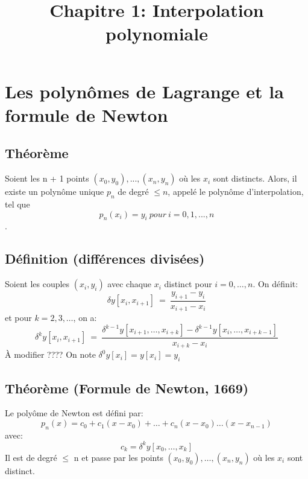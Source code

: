 \documentclass{article}
\title{Chapitre 1: Interpolation polynomiale}
\begin{document}
\maketitle

\section{Les polynômes de Lagrange et la formule de Newton}
\subsection{Théorème}
Soient les n + 1 points $(x_0, y_0), . . . , (x_n , y_n )$ où les $x_i$ sont distincts. Alors, il
existe un polynôme unique $p_n$ de degré $\leq n$, appelé le polynôme d’interpolation, tel que
$$p_n (x_i ) = y_i\ pour\ i = 0, 1, . . . , n$$.

\subsection{Définition (différences divisées)}
Soient les couples $(x_i, y_i)$ avec chaque $x_i$ distinct pour $i = 0, \dots, n$. On définit:
$$\delta y[x_i, x_{i+1}]\ = \ \frac{y_{i + 1} - y_i}{x_{i+1} - x_i}$$
et pour $k = 2, 3, \dots$, on a:
$$\delta^k y[x_i, x_{i + 1}]\ = \ \frac{\delta^{k - 1} y[x_{i + 1}, \dots, x_{i + k}]- \delta^{k-1} y[x_i, \dots, x_{i + k - 1}]}{x_{i + k} - x_i}$$
À modifier ????
On note $\delta^0 y[x_i] = y[x_i] = y_i$
\subsection{Théorème (Formule de Newton, 1669)}
Le polyôme de Newton est défini par:
$$p_n(x) = c_0 + c_1(x-x_0) + \dots + c_n(x - x_0)\dots (x-x_{n - 1})$$
avec:
$$c_k = \delta^k y[x_0, \dots, x_k]$$
Il est de degré $\leq$ n et passe par les points $(x_0, y_0), \dots, (x_n, y_n)$ où les $x_i$ sont distinct.
\end{document}
